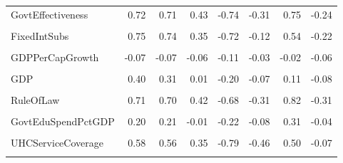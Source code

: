 \documentclass[
]{article}
\begin{document}
\begin{table}
{\begin{tabular}[t]{lrrrrrrr}
GovtEffectiveness & 0.72 & 0.71 & 0.43 & -0.74 & -0.31 & 0.75 & -0.24\\
\cellcolor{gray!10}{ShippingIndex} & \cellcolor{gray!10}{0.43} & \cellcolor{gray!10}{0.39} & \cellcolor{gray!10}{0.17} & \cellcolor{gray!10}{-0.47} & \cellcolor{gray!10}{-0.24} & \cellcolor{gray!10}{0.13} & \cellcolor{gray!10}{-0.23}\\
FixedIntSubs & 0.75 & 0.74 & 0.35 & -0.72 & -0.12 & 0.54 & -0.22\\
\cellcolor{gray!10}{InternetUsersPct} & \cellcolor{gray!10}{0.64} & \cellcolor{gray!10}{0.63} & \cellcolor{gray!10}{0.37} & \cellcolor{gray!10}{-0.77} & \cellcolor{gray!10}{-0.16} & \cellcolor{gray!10}{0.44} & \cellcolor{gray!10}{-0.20}\\
\addlinespace
GDPPerCapGrowth & -0.07 & -0.07 & -0.06 & -0.11 & -0.03 & -0.02 & -0.06\\
\cellcolor{gray!10}{GDPGrowth} & \cellcolor{gray!10}{-0.12} & \cellcolor{gray!10}{-0.12} & \cellcolor{gray!10}{-0.03} & \cellcolor{gray!10}{0.00} & \cellcolor{gray!10}{0.07} & \cellcolor{gray!10}{-0.13} & \cellcolor{gray!10}{-0.07}\\
GDP & 0.40 & 0.31 & 0.01 & -0.20 & -0.07 & 0.11 & -0.08\\
\cellcolor{gray!10}{PoliticalStability} & \cellcolor{gray!10}{0.46} & \cellcolor{gray!10}{0.46} & \cellcolor{gray!10}{0.36} & \cellcolor{gray!10}{-0.51} & \cellcolor{gray!10}{-0.31} & \cellcolor{gray!10}{0.68} & \cellcolor{gray!10}{-0.18}\\
RuleOfLaw & 0.71 & 0.70 & 0.42 & -0.68 & -0.31 & 0.82 & -0.31\\
\addlinespace
\cellcolor{gray!10}{RqdEduYears} & \cellcolor{gray!10}{0.28} & \cellcolor{gray!10}{0.26} & \cellcolor{gray!10}{0.11} & \cellcolor{gray!10}{-0.30} & \cellcolor{gray!10}{-0.12} & \cellcolor{gray!10}{0.32} & \cellcolor{gray!10}{0.09}\\
GovtEduSpendPctGDP & 0.20 & 0.21 & -0.01 & -0.22 & -0.08 & 0.31 & -0.04\\
\cellcolor{gray!10}{MortalityFromDirtyness} & \cellcolor{gray!10}{-0.35} & \cellcolor{gray!10}{-0.34} & \cellcolor{gray!10}{NA} & \cellcolor{gray!10}{0.70} & \cellcolor{gray!10}{0.49} & \cellcolor{gray!10}{-0.34} & \cellcolor{gray!10}{0.11}\\
UHCServiceCoverage & 0.58 & 0.56 & 0.35 & -0.79 & -0.46 & 0.50 & -0.07\\
\cellcolor{gray!10}{HealthSpendPerCapita} & \cellcolor{gray!10}{1.00} & \cellcolor{gray!10}{0.97} & \cellcolor{gray!10}{0.38} & \cellcolor{gray!10}{-0.52} & \cellcolor{gray!10}{-0.10} & \cellcolor{gray!10}{0.57} & \cellcolor{gray!10}{-0.24}\\

\end{tabular}}
\end{table}
\end{document}
